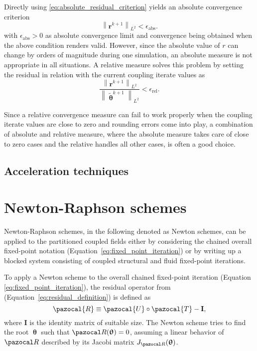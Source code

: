 Directly using \eqref{eq:absolute_residual_criterion} yields an absolute convergence criterion
\begin{equation}
\left\|\boldsymbol{r} ^{k+1}\right\|_{L^{2}}<\epsilon_\mathrm{abs}.
\end{equation}
with $\epsilon_\mathrm{abs}>0$ as absolute convergence limit and convergence being obtained when the above condition renders valid.
However, since the absolute value of $r$ can change by orders of magnitude during one simulation, an absolute measure is not appropriate in all situations.
A relative measure solves this problem by setting the residual in relation with the current coupling iterate values as
\begin{equation}
\frac{\left\|\mathbf{r}^{k+1}\right\|_{L^{2}}}{\left\|\tilde{\bm{\uptheta}}^{k+1}\right\|_{L^{2}}}<\epsilon_\mathrm{rel}.
\end{equation}

Since a relative convergence measure can fail to work properly when the coupling iterate values are close to zero and rounding errors come into play, a combination of absolute and relative measure, where the absolute measure takes care of close to zero cases and the relative handles all other cases, is often a good choice.

\subsection{Acceleration techniques}

\section{Newton-Raphson schemes}

Newton-Raphson schemes, in the following denoted as Newton schemes, can be applied to the partitioned coupled fields either by considering the chained overall fixed-point notation (Equation~\eqref{eq:fixed_point_iteration}) or by writing up a blocked system consisting of coupled structural and fluid fixed-point iterations.

To apply a Newton scheme to the overall chained fixed-point iteration (Equation \eqref{eq:fixed_point_iteration}), the residual operator from (Equation~\eqref{eq:residual_definition}) is defined as
\begin{equation} \label{eq:residual_fixed_point}
\pazocal{R}\equiv\pazocal{U} \circ \pazocal {T}-\mathbf{I},
\end{equation}
where $\mathbf{I}$ is the identity matrix of suitable size.
The Newton scheme tries to find the root $\bm \uptheta$ such that $\pazocal R(\bm \uptheta)=0$, assuming a linear behavior of $\pazocal R$ described by its Jacobi matrix $J_{\pazocal R}(\bm \uptheta)$.

